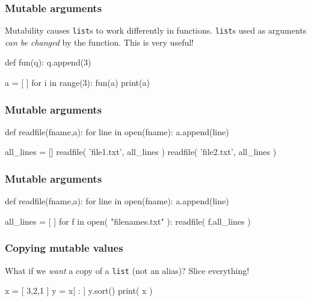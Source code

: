 \documentclass[11pt]{beamer}
\begin{document}
\begin{frame}[fragile]
  \frametitle{Mutable arguments}
  \Enlarge

  \begin{itemize}
  \myitem  Mutability causes \texttt{list}s to work differently in functions. %
  \myitem  \texttt{list}s used as arguments \emph{can be changed} by the function. %
  \myitem  This is very useful! %
  \end{itemize}
  \begin{semiverbatim}
def fun(q):
    q.append(3)

a = [ ]
for i in range(3):
    fun(a)
print(a)
  \end{semiverbatim}
\end{frame}

\begin{frame}[fragile]
  \frametitle{Mutable arguments}
  \Enlarge

  \begin{semiverbatim}
def readfile(fname,a):
    for line in open(fname):
        a.append(line)

all_lines = []
readfile( 'file1.txt', all_lines )
readfile( 'file2.txt', all_lines )
  \end{semiverbatim}
\end{frame}

\begin{frame}[fragile]
  \frametitle{Mutable arguments}
  \Enlarge

  \begin{semiverbatim}
def readfile(fname,a):
    for line in open(fname):
        a.append(line)

all_lines = [ ]
for f in open( "filenames.txt" ):
    readfile( f,all_lines )
  \end{semiverbatim}
\end{frame}

\begin{frame}[fragile]
  \frametitle{Copying mutable values}
  \Enlarge

  \begin{itemize}
  \myitem  What if we \emph{want} a copy of a \texttt{list} (not an alias)? %
  \myitem  Slice everything! %
  \end{itemize}
  \begin{semiverbatim}
x = [ 3,2,1 ]
y = x[ : ]
y.sort()
print( x )
  \end{semiverbatim}
\end{frame}
\end{document}
